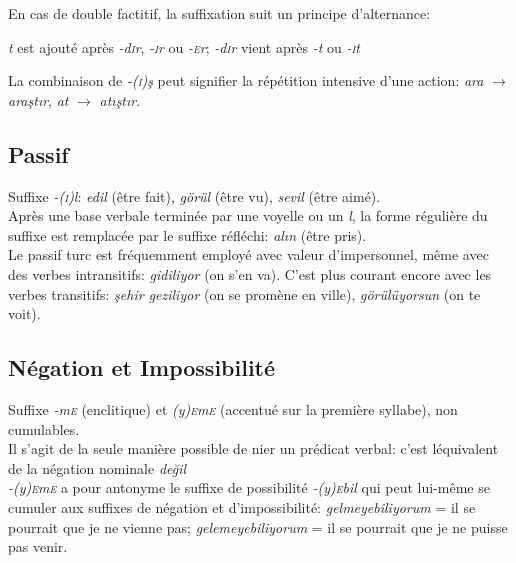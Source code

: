 \documentclass{cours}
\newcommand{\ch}{\c{s}}
\newcommand{\ug}{\u{g}}
\newcommand{\sci}{\textsc{i}}
\newcommand{\sce}{\textsc{e}}
\begin{document}
En cas de double factitif, la suffixation suit un principe d'alternance:
\begin{center}
    \textsl{t} est ajouté après \textsl{-d\sci r}, \textsl{-\sci r} ou \textsl{-\sce r}; \textsl{-d\sci r} vient après \textsl{-t} ou \textsl{-\sci t}
\end{center}
La combinaison de \textsl{-(\sci)\ch} peut signifier la répétition intensive d'une action: \textsl{ara} $\rightarrow$ \textsl{ara\ch t\i r}, \textsl{at} $\rightarrow$ \textsl{at\i \ch t\i r}.

\subsection{Passif}
Suffixe \textsl{-(\sci)l}: \textsl{edil} (être fait), \textsl{görül} (être vu), \textsl{sevil} (être aimé).\\
Après une base verbale terminée par une voyelle ou un \textsl{l}, la forme régulière du suffixe est remplacée par le suffixe réfléchi: \textsl{al\i n} (être pris).\\
Le passif turc est fréquemment employé avec valeur d'impersonnel, même avec des verbes intransitifs: \textsl{gidiliyor} (on s'en va). C'est plus courant encore avec les verbes transitifs: \textsl{\ch ehir geziliyor} (on se promène en ville), \textsl{görülüyorsun} (on te voit).
\subsection{Négation et Impossibilité}
Suffixe \textsl{-m\sce} (enclitique) et \textsl{(y)\sce m\sce} (accentué sur la première syllabe), non cumulables.\\
Il s'agit de la seule manière possible de nier un prédicat verbal: c'est léquivalent de la négation nominale {\sl de\ug il}\\
\textsl{-(y)\sce m\sce} a pour antonyme le suffixe de possibilité \textsl{-(y)\sce bil} qui peut lui-même se cumuler aux suffixes de négation et d'impossibilité: \textsl{gelmeyebiliyorum} = il se pourrait que je ne vienne pas; \textsl{gelemeyebiliyorum} = il se pourrait que je ne puisse pas venir.
\end{document}
